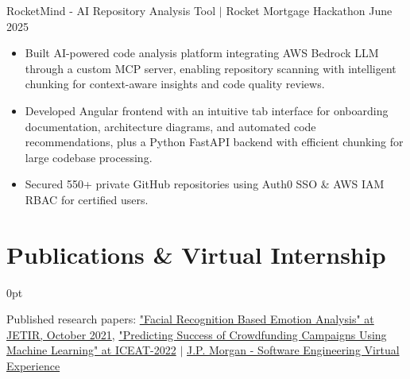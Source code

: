 \documentclass[letterpaper,10pt]{article}
\newlength{\contentindent}
\newcommand{\sectioncontent}[1]{%
  \begin{adjustwidth}{\contentindent}{0pt}%
  #1%
  \end{adjustwidth}%
}
\begin{document}
{RocketMind - AI Repository Analysis Tool $|$ Rocket Mortgage Hackathon \hfill June 2025
\begin{itemize}
    \item Built AI-powered code analysis platform integrating AWS Bedrock LLM through a custom MCP server, enabling repository scanning with intelligent chunking for context-aware insights and code quality reviews.
    \item Developed Angular frontend with an intuitive tab interface for onboarding documentation, architecture diagrams, and automated code recommendations, plus a Python FastAPI backend with efficient chunking for large codebase processing.
    \item Secured 550+ private GitHub repositories using Auth0 SSO \& AWS IAM RBAC for certified users.
\end{itemize}
}

\section{Publications \& Virtual Internship}
\sectioncontent{
{Published research papers: \href{https://www.jetir.org/view?paper=JETIRFD06059}{"Facial Recognition Based Emotion Analysis" at JETIR, October 2021}},  \href{https://drive.google.com/file/d/1oAuZegjDGTgZXc2WC4bzxeZQ2XF0wVNs/view?usp=sharing}{"Predicting Success of Crowdfunding Campaigns Using Machine Learning" at ICEAT-2022} $|$
\href{https://drive.google.com/file/d/1KVM6ewcn56FYNm9yJX6cdct4bhXv-Cez/view?usp=sharing}{J.P. Morgan - Software Engineering Virtual Experience}
}
\end{document}
